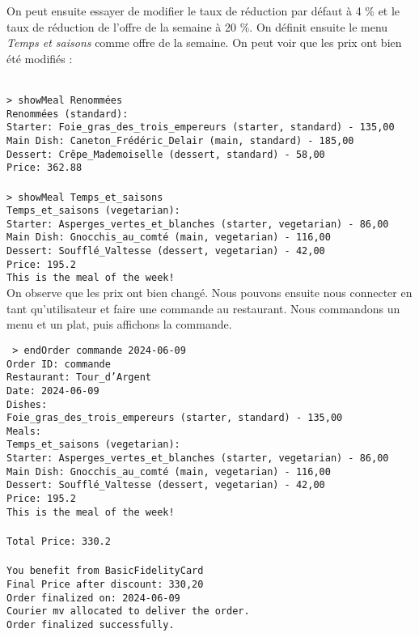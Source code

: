 On peut ensuite essayer de modifier le taux de réduction par défaut à 4 \% et le taux de réduction de l'offre de la semaine à 20 \%. On définit ensuite le menu \textit{Temps et saisons} comme offre de la semaine. On peut voir que les prix ont bien été modifiés :

\texttt{\\
> showMeal Renommées\\
Renommées (standard):\\
Starter: Foie\_gras\_des\_trois\_empereurs (starter, standard) - 135,00\\
Main Dish: Caneton\_Frédéric\_Delair (main, standard) - 185,00\\
Dessert: Crêpe\_Mademoiselle (dessert, standard) - 58,00\\
Price: 362.88\\
\\
> showMeal Temps\_et\_saisons\\
Temps\_et\_saisons (vegetarian):\\
Starter: Asperges\_vertes\_et\_blanches (starter, vegetarian) - 86,00\\
Main Dish: Gnocchis\_au\_comté (main, vegetarian) - 116,00\\
Dessert: Soufflé\_Valtesse (dessert, vegetarian) - 42,00\\
Price: 195.2\\
This is the meal of the week!}\\

On observe que les prix ont bien changé. Nous pouvons ensuite nous connecter en tant qu'utilisateur et faire une commande au restaurant. Nous commandons un menu et un plat, puis affichons la commande.

\texttt{
> endOrder commande 2024-06-09\\
Order ID: commande\\
Restaurant: Tour\_d'Argent\\
Date: 2024-06-09\\
Dishes:\\
  Foie\_gras\_des\_trois\_empereurs (starter, standard) - 135,00\\
Meals:\\
  Temps\_et\_saisons (vegetarian):\\
Starter: Asperges\_vertes\_et\_blanches (starter, vegetarian) - 86,00\\
Main Dish: Gnocchis\_au\_comté (main, vegetarian) - 116,00\\
Dessert: Soufflé\_Valtesse (dessert, vegetarian) - 42,00\\
Price: 195.2\\
This is the meal of the week!\\
\\
Total Price: 330.2\\
\\
You benefit from BasicFidelityCard\\
Final Price after discount: 330,20\\
Order finalized on: 2024-06-09\\
Courier mv allocated to deliver the order.\\
Order finalized successfully.\\
}

